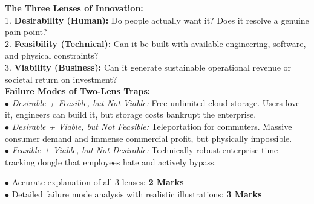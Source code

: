 \begin{solutionbox}
\textbf{The Three Lenses of Innovation:}\\
1. \textbf{Desirability (Human):} Do people actually want it? Does it resolve a genuine pain point?\\
2. \textbf{Feasibility (Technical):} Can it be built with available engineering, software, and physical constraints?\\
3. \textbf{Viability (Business):} Can it generate sustainable operational revenue or societal return on investment?\\
\textbf{Failure Modes of Two-Lens Traps:}\\
$\bullet$ \textit{Desirable + Feasible, but Not Viable:} Free unlimited cloud storage. Users love it, engineers can build it, but storage costs bankrupt the enterprise.\\
$\bullet$ \textit{Desirable + Viable, but Not Feasible:} Teleportation for commuters. Massive consumer demand and immense commercial profit, but physically impossible.\\
$\bullet$ \textit{Feasible + Viable, but Not Desirable:} Technically robust enterprise time-tracking dongle that employees hate and actively bypass.
\begin{markingrubric}
$\bullet$ Accurate explanation of all 3 lenses: \textbf{2 Marks}\\
$\bullet$ Detailed failure mode analysis with realistic illustrations: \textbf{3 Marks}
\end{markingrubric}
\end{solutionbox}

